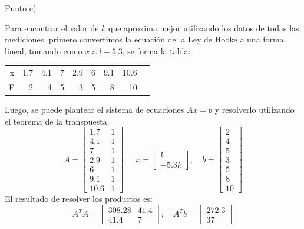 \documentclass{article}
\begin{document}
\begin{center}
    Punto c) \\
\end{center}

Para encontrar el valor de \( k \) que aproxima mejor utilizando los datos de todas las mediciones, primero convertimos la ecuación de la Ley de Hooke a una forma lineal, tomando como \( x \) a \( l-5.3 \), se forma la tabla:
\begin{center}
    \begin{tabular}{||r||r|r|r|r|r|r|r|r||}
    \hline
    x & 1.7 & 4.1 & 7 & 2.9 & 6 & 9.1 & 10.6 \\
    F & 2 & 4 & 5 & 3 & 5 & 8 & 10 \\
    \hline
    \end{tabular}
\end{center}
Luego, se puede plantear el sistema de ecuaciones \( Ax = b \) y resolverlo utilizando el teorema de la transpuesta.
\begin{equation}
    A = \begin{bmatrix}
        1.7 & 1 \\
        4.1 & 1 \\
        7 & 1 \\
        2.9 & 1 \\
        6 & 1 \\
        9.1 & 1 \\
        10.6 & 1
    \end{bmatrix}, \quad x = \begin{bmatrix}
        k \\
        -5.3k
    \end{bmatrix}, \quad b = \begin{bmatrix}
        2 \\
        4 \\
        5 \\
        3 \\
        5 \\
        8 \\
        10
    \end{bmatrix}
\end{equation}
El resultado de resolver los productos es:
\begin{equation}
    A^TA = \begin{bmatrix}
        308.28 & 41.4 \\
        41.4 & 7
    \end{bmatrix}, \quad A^Tb = \begin{bmatrix}
        272.3 \\
        37
    \end{bmatrix}
\end{equation}
\end{document}
